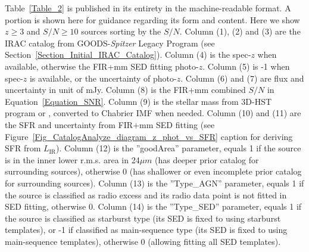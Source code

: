 \begin{table*}
\begin{center}
\begin{minipage}{0.95\textwidth}
    
    Table~\ref{Table_2} is published in its entirety in the machine-readable format. 
    A portion is shown here for guidance regarding its form and content. 
    Here we show $z \ge 3$ and $S/N \ge 10$ sources sorting by the $S/N$. 
    Column (1), (2) and (3) are the IRAC catalog from GOODS-\textit{Spitzer} Legacy Program 
    (see Section~\ref{Section_Initial_IRAC_Catalog}). 
    Column (4) is the spec-$z$ when available,  
    otherwise the FIR+mm SED fitting photo-$z$.  
    Column (5) is -1 when spec-$z$ is available,  
    or the uncertainty of photo-$z$.  
    Column (6) and (7) are flux and uncertainty in unit of mJy.  
    Column (8) is the FIR+mm combined $S/N$ in Equation~\ref{Equation_SNR}.  
    Column (9) is the stellar mass from 3D-HST program or \citet{Pannella2015},  
    converted to Chabrier IMF when needed.  
    Column (10) and (11) are the SFR and uncertainty from FIR+mm SED fitting  
    (see Figure~\ref{Fig_CatalogAnalyze_diagram_z_phot_vs_SFR}  
    caption for deriving SFR from $L_{\mathrm{IR}}$).  
    Column (12) is the ''goodArea'' parameter,  
    equals 1 if the source is in the inner lower r.m.s. area in 24${\mu}m$  
    (has deeper prior catalog for surrounding sources),  
    otherwise 0 (has shallower or even incomplete prior catalog for surrounding sources).  
    Column (13) is the ''Type\_AGN'' parameter,  
    equals 1 if the source is classified as radio excess and  
    its radio data point is not fitted in SED fitting, otherwise 0.  
    Column (14) is the ''Type\_SED'' parameter,  
    equals 1 if the source is classified as starburst type  
    (its SED is fixed to using starburst templates),  
    or -1 if classified as main-sequence type  
    (its SED is fixed to using main-sequence templates), 
    otherwise 0 (allowing fitting all SED templates). 
    
\end{minipage}

\end{center}

\end{table*}

